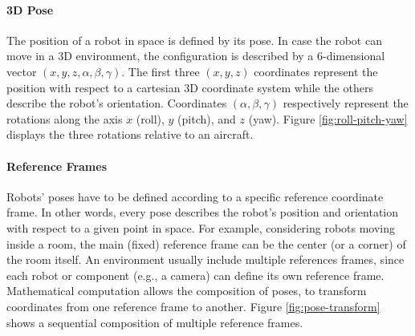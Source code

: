 \paragraph*{3D Pose} 
The position of a robot in space is defined by its pose. In case the robot can move in a 3D environment, the configuration is described by a 6-dimensional vector $(x, y, z, \alpha, \beta, \gamma)$. The first three $(x, y, z)$ coordinates represent the position with respect to a cartesian 3D coordinate system while the others describe the robot's orientation. Coordinates $(\alpha, \beta, \gamma)$ respectively represent the rotations along the axis $x$ (roll), $y$ (pitch), and $z$ (yaw). Figure \ref{fig:roll-pitch-yaw} displays the three rotations relative to an aircraft.

\paragraph*{Reference Frames} 
Robots' poses have to be defined according to a specific reference coordinate frame. In other words, every pose describes the robot's position and orientation with respect to a given point in space. For example, considering robots moving inside a room, the main (fixed) reference frame can be the center (or a corner) of the room itself. An environment usually include multiple references frames, since each robot or component (e.g., a camera) can define its own reference frame. Mathematical computation allows the composition of poses, to transform coordinates from one reference frame to another. Figure \ref{fig:pose-transform} shows a sequential composition of multiple reference frames.

